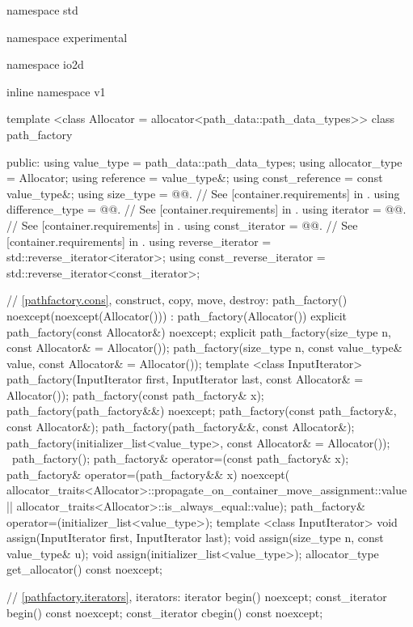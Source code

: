 \begin{codeblock}
namespace std { namespace experimental { namespace io2d { inline namespace v1 {
  template <class Allocator = allocator<path_data::path_data_types>>
  class path_factory {
  public:
    using value_type = path_data::path_data_types;
    using allocator_type = Allocator;
    using reference = value_type&;
    using const_reference = const value_type&;
    using size_type       = @@. // See [container.requirements] in \cppseventeen.
    using difference_type = @@. // See [container.requirements] in \cppseventeen.
    using iterator       = @@. // See [container.requirements] in \cppseventeen.
    using const_iterator = @@. // See [container.requirements] in \cppseventeen.
    using reverse_iterator       = std::reverse_iterator<iterator>;
    using const_reverse_iterator = std::reverse_iterator<const_iterator>;
    
    // \ref{pathfactory.cons}, construct, copy, move, destroy:
    path_factory() noexcept(noexcept(Allocator())) :
      path_factory(Allocator()) { }
    explicit path_factory(const Allocator&) noexcept;
    explicit path_factory(size_type n, const Allocator& = Allocator());
    path_factory(size_type n, const value_type& value,
      const Allocator& = Allocator());
    template <class InputIterator>
    path_factory(InputIterator first, InputIterator last,
      const Allocator& = Allocator());
    path_factory(const path_factory& x);
    path_factory(path_factory&&) noexcept;
    path_factory(const path_factory&, const Allocator&);
    path_factory(path_factory&&, const Allocator&);
    path_factory(initializer_list<value_type>, const Allocator& = Allocator());
    ~path_factory();
    path_factory& operator=(const path_factory& x);
    path_factory& operator=(path_factory&& x)
      noexcept(
      allocator_traits<Allocator>::propagate_on_container_move_assignment::value
      ||
      allocator_traits<Allocator>::is_always_equal::value);
    path_factory& operator=(initializer_list<value_type>);
    template <class InputIterator>
    void assign(InputIterator first, InputIterator last);
    void assign(size_type n, const value_type& u);
    void assign(initializer_list<value_type>);
    allocator_type get_allocator() const noexcept;
    
    // \ref{pathfactory.iterators}, iterators:
    iterator begin() noexcept;
    const_iterator begin() const noexcept;
    const_iterator cbegin() const noexcept;

}}}}}
\end{codeblock}
